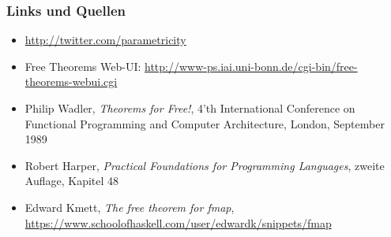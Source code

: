 \documentclass{beamer}
\begin{document}
\begin{frame}
  \frametitle{Links und Quellen}
  \begin{itemize}
    \item \url{http://twitter.com/parametricity}
    \item Free Theorems Web-UI: \url{http://www-ps.iai.uni-bonn.de/cgi-bin/free-theorems-webui.cgi}
    \item Philip Wadler, \textit{Theorems for Free!}, 4'th International Conference on Functional Programming and Computer Architecture, London, September 1989
    \item Robert Harper, \textit{Practical Foundations for Programming Languages}, zweite Auflage, Kapitel 48
    \item Edward Kmett, \textit{The free theorem for fmap}, \url{https://www.schoolofhaskell.com/user/edwardk/snippets/fmap}
  \end{itemize}
\end{frame}
\end{document}
